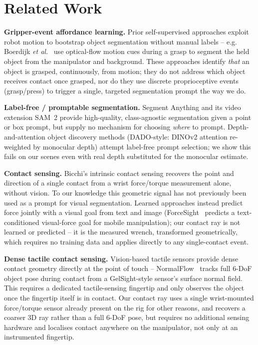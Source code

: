 \documentclass[letterpaper, 10pt, journal, twoside]{IEEEtran}
\begin{document}
\section{Related Work}

\textbf{Gripper-event affordance learning.} Prior self-supervised
approaches exploit robot motion to bootstrap object segmentation without
manual labels -- e.g. Boerdijk \emph{et al.}~\cite{boerdijk2021gripper} use
optical-flow motion cues during a grasp to segment the held object from
the manipulator and background. These approaches identify \emph{that} an
object is grasped, continuously, from motion; they do not address which
object receives contact once grasped, nor do they use discrete
proprioceptive events (grasp/press) to trigger a single, targeted
segmentation prompt the way we do.

\textbf{Label-free / promptable segmentation.} Segment Anything
\cite{kirillov2023sam} and its video extension SAM~2
\cite{ravi2024sam2} provide high-quality, class-agnostic segmentation
given a point or box prompt, but supply no mechanism for choosing
\emph{where} to prompt. Depth-and-attention object discovery methods
(DADO-style: DINOv2 attention re-weighted by monocular depth) attempt
label-free prompt selection; we show this fails on our scenes even with
real depth substituted for the monocular estimate.

\textbf{Contact sensing.} Bicchi's intrinsic contact sensing
\cite{bicchi1990} recovers the point and direction of a single contact
from a wrist force/torque measurement alone, without vision. To our
knowledge this geometric signal has not previously been used as a prompt
for visual segmentation. Learned approaches instead predict force jointly
with a visual goal from text and image (ForceSight~\cite{collins2023forcesight}
predicts a text-conditioned visual-force goal for mobile manipulation);
our contact ray is not learned or predicted -- it is the measured wrench,
transformed geometrically, which requires no training data and applies
directly to any single-contact event.

\textbf{Dense tactile contact sensing.} Vision-based tactile sensors
provide dense contact geometry directly at the point of touch --
NormalFlow~\cite{huang2025normalflow} tracks full 6-DoF object pose
during contact from a GelSight-style sensor's surface normal field. This
requires a dedicated tactile-sensing fingertip and only observes the
object once the fingertip itself is in contact. Our contact ray uses a
single wrist-mounted force/torque sensor already present on the rig for
other reasons, and recovers a coarser 3D ray rather than a full 6-DoF
pose, but requires no additional sensing hardware and localises contact
anywhere on the manipulator, not only at an instrumented fingertip.
\end{document}

